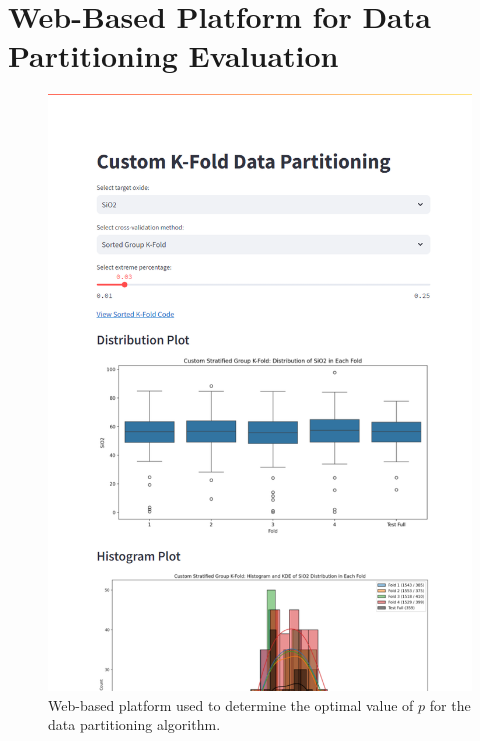 \section{Web-Based Platform for Data Partitioning Evaluation}

\begin{figure}[h]
    \centering
    \includegraphics[width=\textwidth]{images/web_platform.png}
    \caption{Web-based platform used to determine the optimal value of $p$ for the data partitioning algorithm.}
    \label{fig:web_platform}
\end{figure}